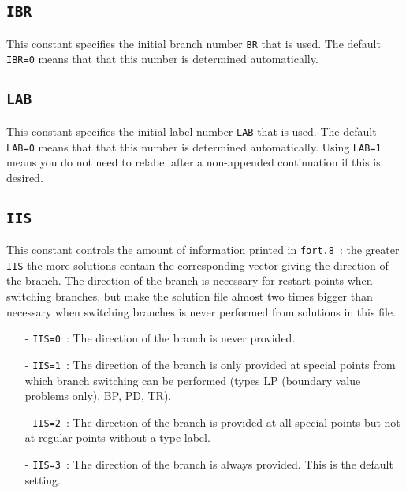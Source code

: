 \documentclass[12pt]{report}
\begin{document}
\subsection{\texttt{IBR}} \label{sec:IBR} 
 This constant specifies the initial branch number {\tt BR} that is
 used. The default {\tt IBR=0} means that that this number is
 determined automatically.

\subsection{\texttt{LAB}} \label{sec:LAB} 
 This constant specifies the initial label number {\tt LAB} that is
 used. The default {\tt LAB=0} means that that this number is
 determined automatically. Using {\tt LAB=1} means you do not need
 to relabel after a non-appended continuation if this is desired.

\subsection{\texttt{IIS}} \label{sec:IIS} 
 This constant controls the amount of information printed in {\tt fort.8}~:
 the greater {\tt IIS} the more solutions contain the corresponding
 vector giving the direction of the branch. The direction of the
 branch is necessary for restart points when switching branches, but
 make the solution file almost two times bigger than necessary when
 switching branches is never performed from solutions in this file.

\begin{itemize}
\item[-] {\tt IIS=0}~:
  The direction of the branch is never provided.
\item[-] {\tt IIS=1}~:
  The direction of the branch is only provided at special points from
  which branch switching can be performed (types LP (boundary value
  problems only), BP, PD, TR).
\item[-] {\tt IIS=2}~:
  The direction of the branch is provided at all special points but
  not at regular points without a type label.
\item[-] {\tt IIS=3}~:
  The direction of the branch is always provided. This is the default
  setting.
\end{itemize}
\end{document}
